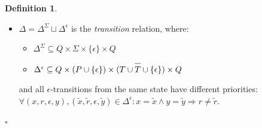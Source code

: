 \documentclass{article}
\newcommand{\Xin}{\!\in\!}
\newcommand{\Xeq}{\!=\!}
\newcommand*{\Xbar}[1]{\overline{#1\vphantom{\bar{#1}}}}
\theoremstyle{definition}
\newtheorem{Xdef}{Definition}
\begin{document}
\begin{multicols}{2}
\begin{Xdef}
\begin{itemize}
        \item[] $\Delta \Xeq \Delta^\Sigma \sqcup \Delta^\epsilon$ is the \emph{transition} relation, where:
        \begin{itemize}
            \item[] $\Delta^\Sigma \subseteq Q \times \Sigma \times \{\epsilon\} \times Q$
            \item[] $\Delta^\epsilon \subseteq Q \times (P \cup \{\epsilon\}) \times (T \cup \Xbar{T} \cup \{\epsilon\}) \times Q$
        \end{itemize}


        and all $\epsilon$-transitions from the same state have different priorities:
        $\forall (x, r, \epsilon, y), (\widetilde{x}, \widetilde{r}, \epsilon, \widetilde{y}) \Xin \Delta^\epsilon:
        x \Xeq \widetilde{x} \wedge y \Xeq \widetilde{y} \Rightarrow r \!\neq\! \widetilde{r}$.
    \end{itemize}
    $\square$
    \end{Xdef}


\end{multicols}
\end{document}
